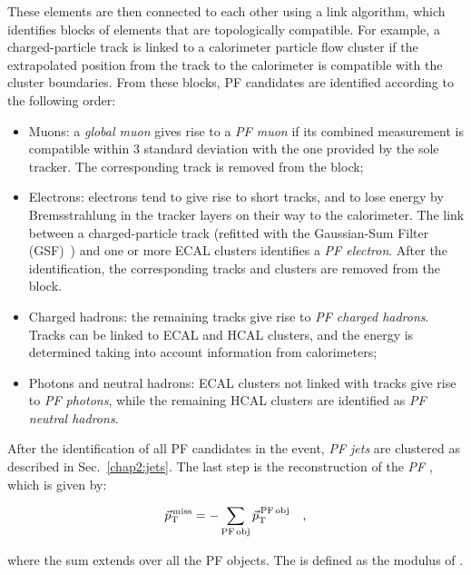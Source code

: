 These elements are then connected to each other using a link algorithm, which identifies blocks of elements that are topologically compatible. For example, a charged-particle track is linked to a calorimeter particle flow cluster if the extrapolated position from the track to the calorimeter is compatible with the cluster boundaries. From these blocks, PF candidates are identified according to the following order:
\begin{itemize}
\item Muons: a \emph{global muon} gives rise to a \emph{PF muon} if its combined \pt measurement is compatible within 3 standard deviation with the one provided by the sole tracker. The corresponding track is removed from the block;
\item Electrons: electrons tend to give rise to short tracks, and to lose energy by Bremsstrahlung in the tracker layers on their way to the calorimeter. The link between a charged-particle track (refitted with the Gaussian-Sum Filter (GSF)~\cite{Adam:815410}) and one or more ECAL clusters identifies a \emph{PF electron}. After the identification, the corresponding tracks and clusters are removed from the block.
\item Charged hadrons: the remaining tracks give rise to \emph{PF charged hadrons}. Tracks can be linked to ECAL and HCAL clusters, and the energy is determined taking into account information from calorimeters;
\item Photons and neutral hadrons: ECAL clusters not linked with tracks give rise to \emph{PF photons}, while the remaining HCAL clusters are identified as \emph{PF neutral hadrons}.
\end{itemize}
After the identification of all PF candidates in the event, \emph{PF jets} are clustered as described in Sec.~\ref{chap2:jets}. The last step is the reconstruction of the \emph{PF \ptmiss}, which is given by:

\begin{equation} 
\vec{p}_\mathrm{T}^\mathrm{\,miss} = - \sum_{\mathrm{PF\,obj}} \vec{p}_\mathrm{T}^\mathrm{\,PF\,obj} \quad,
\end{equation}

where the sum extends over all the PF objects. The \MET is defined as the modulus of \ptmiss.
